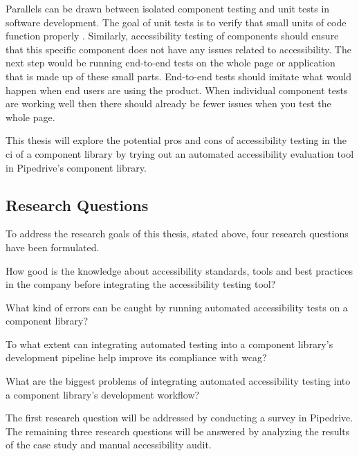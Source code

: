 \documentclass{master_thesis}
\begin{document}
Parallels can be drawn between isolated component testing and unit tests in software development. The goal of unit tests is to verify that small units of code function properly \citep[p.60]{Humble2010}. Similarly, accessibility testing of components should ensure that this specific component does not have any issues related to accessibility. The next step would be running end-to-end tests on the whole page or application that is made up of these small parts. End-to-end tests should imitate what would happen when end users are using the product. When individual component tests are working well then there should already be fewer issues when you test the whole page.

This thesis will explore the potential pros and cons of accessibility testing in the \ac{ci} of a component library by trying out an automated accessibility evaluation tool in Pipedrive's component library.

\subsection{Research Questions}

To address the research goals of this thesis, stated above, four research questions have been formulated.

	\begin{RQlist}
		\item How good is the knowledge about accessibility standards, tools and best practices in the company before integrating the accessibility testing tool?
		\item What kind of errors can be caught by running automated accessibility tests on a component library?
		\item To what extent can integrating automated testing into a component library's development pipeline help improve its compliance with \ac{wcag}?
		\item What are the biggest problems of integrating automated accessibility testing into a component library's development workflow?
	\end{RQlist}

The first research question will be addressed by conducting a survey in Pipedrive. The remaining three research questions will be answered by analyzing the results of the case study and manual accessibility audit.
\end{document}
